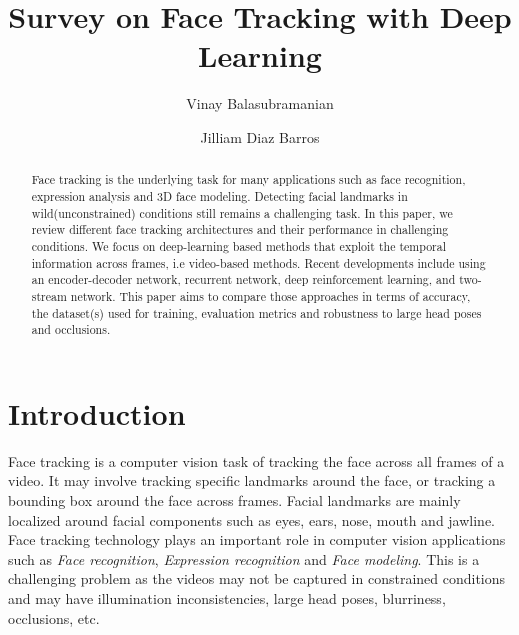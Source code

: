 \documentclass{llncs}
\begin{document}
	
	\pagestyle{headings} %
	
	\title{Survey on Face Tracking with Deep Learning}
	\author{Vinay Balasubramanian \and Jilliam Diaz Barros}
	
	\maketitle %
	
	\begin{abstract}
		Face tracking is the underlying task for many applications such as face recognition, expression analysis and 3D face modeling. Detecting facial landmarks in wild(unconstrained) conditions still remains a challenging task. In this paper, we review different face tracking architectures and their performance in challenging conditions. We focus on deep-learning based methods that exploit the temporal information across frames, i.e video-based methods. Recent developments include using an encoder-decoder network, recurrent network, deep reinforcement learning, and two-stream network. This paper aims to compare those approaches in terms of accuracy, the dataset(s) used for training, evaluation metrics and robustness to large head poses and occlusions.
	\end{abstract}
	
	\section{Introduction}
	Face tracking is a computer vision task of tracking the face across all frames of a video. It may involve tracking specific landmarks around the face, or tracking a bounding box around the face across frames. Facial landmarks are mainly localized around facial components such as eyes, ears, nose, mouth and jawline.
	Face tracking technology plays an important role in computer vision applications such as \textit{Face recognition}\cite{face_recognition}, \textit{Expression recognition}\cite{expression_recognition} and \textit{Face modeling}\cite{face_modeling}. This is a challenging problem as the videos may not be captured in constrained conditions and may have illumination inconsistencies, large head poses, blurriness, occlusions, etc.
	
\end{document}
